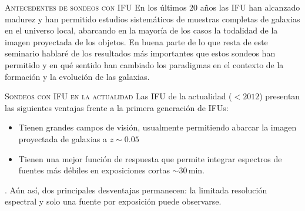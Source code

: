 \documentclass[xcolor=dvipsnames,4pt]{beamer}
\begin{document}
\begin{frame}[allowframebreaks]{\textsc{Antecedentes de sondeos con IFU}}
En los últimos 20 años las IFU han alcanzado madurez y han permitido estudios sistemáticos de
muestras completas de galaxias en el universo local, abarcando en la mayoría de los casos la
todalidad de la imagen proyectada de los objetos. En buena parte de lo que resta de este seminario
hablaré de los resultados más importantes que estos sondeos han permitido y en qué sentido han
cambiado los paradigmas en el contexto de la formación y la evolución de las galaxias.
%
%
\end{frame}

\begin{frame}[allowframebreaks]{\textsc{Sondeos con IFU en la actualidad}}
%
Las IFU de la actualidad ($<2012$) presentan las siguientes ventajas frente a la primera generación
de IFUs:
%
\begin{itemize}
%
\item Tienen grandes campos de visión, usualmente permitiendo abarcar la imagen
proyectada de galaxias a $z\sim0.05$
%
\item Tienen una mejor función de respuesta que permite integrar espectros de fuentes más débiles en
exposiciones cortas $\sim30\,$min.
%
\end{itemize}.
%
Aún así, dos principales desventajas permanecen: la limitada resolución espectral y solo una fuente
por exposición puede observarse.
%
\end{frame}
\end{document}
